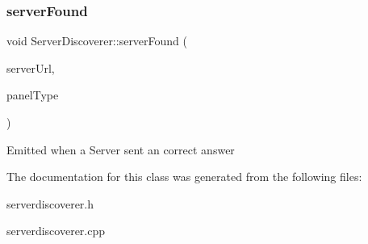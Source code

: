 \subsubsection{\texorpdfstring{server\+Found}{serverFound}}
{\footnotesize\ttfamily void Server\+Discoverer\+::server\+Found (\begin{DoxyParamCaption}\item[{Q\+String}]{server\+Url,  }\item[{int}]{panel\+Type }\end{DoxyParamCaption})\hspace{0.3cm}{\ttfamily [signal]}}

Emitted when a Server sent an correct answer 

The documentation for this class was generated from the following files\+:\begin{DoxyCompactItemize}
\item 
serverdiscoverer.\+h\item 
serverdiscoverer.\+cpp\end{DoxyCompactItemize}
